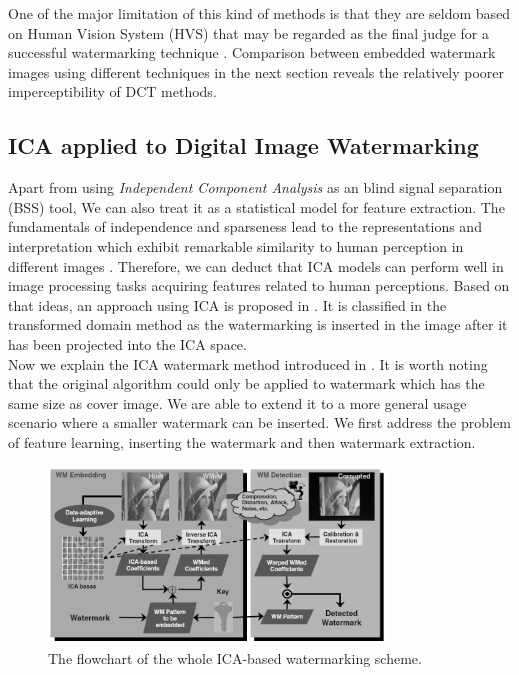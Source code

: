 One of the major limitation of this kind of methods is that they are seldom based on Human Vision System (HVS) that may be regarded as the final judge for a successful watermarking technique \cite{LuWei_ICA}. Comparison between embedded watermark images using different techniques in the next section reveals the relatively poorer imperceptibility of DCT methods.

\subsection{ICA applied to Digital Image Watermarking}
Apart from using \textit{Independent Component Analysis} as an blind signal separation (BSS) tool, We can also treat it as a statistical model for feature extraction. The fundamentals of independence and sparseness lead to the representations and interpretation which exhibit remarkable similarity to human perception in different images \cite{BELL19973327}. Therefore, we can deduct that ICA
models can perform well in image processing tasks acquiring features related to human perceptions. Based on that ideas, an approach using ICA is proposed in \cite{inproceedingsICA_watermark}. It is classified in the transformed domain method as the watermarking is inserted in the image after it has been projected into the ICA space. \\

Now we explain the ICA watermark method introduced in \cite{inproceedingsICA_watermark}. It is worth noting that the original algorithm could only be applied to watermark which has the same size as cover image. We are able to extend it to a more general usage scenario where a smaller watermark can be inserted. We first address the problem of feature learning, inserting the watermark and then watermark extraction.

\begin{figure}[H]
\centering
\includegraphics[width=0.8\textwidth]{images/ICA_flowchart_gray.png}
\caption{The flowchart of the whole ICA-based watermarking scheme. \cite{LuWei_ICA}}
\label{flow_ICA}
\end{figure}


